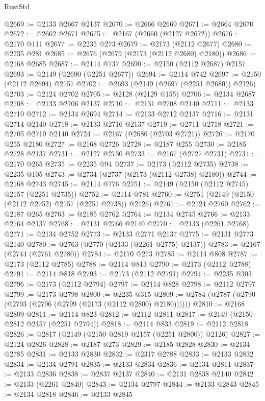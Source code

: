 \begin{lexlean}{RustStd}
\begin{coremodule}
@2669 := @2133 @2667 @2137
@2670 := @2666 @2669
@2671 := @2664 @2670
@2672 := @2662 @2671
@2675 := @2167 (@2660 (@2127 @2672))
@2676 := @2170 @111
@2677 := @2235 @273
@2679 := @2173 (@2112 @2677)
@2680 := @2235 @281
@2685 := @2676 (@2679 (@2173 (@2112 @2680) @2180))
@2686 := @2168 @2685
@2687 := @2114 @737
@2690 := @2150 (@2112 @2687) @2157
@2693 := @2149 (@2690 (@2251 @2677))
@2694 := @2114 @742
@2697 := @2150 (@2112 @2694) @2157
@2702 := @2693 (@2149 (@2697 (@2251 @2680)) @2126)
@2703 := @2124 @2702
@2705 := @2128 (@2129 @155)
@2706 := @2134 @2687
@2708 := @2133 @2706 @2137
@2710 := @2131 @2708 @2140
@2711 := @2133 @2710
@2712 := @2134 @2694
@2714 := @2133 @2712 @2137
@2716 := @2131 @2714 @2140
@2718 := @2133 @2716 @2137
@2719 := @2711 @2718
@2721 := @2705 @2719 @2140
@2724 := @2167 (@2686 (@2703 @2721))
@2726 := @2170 @255 @2180
@2727 := @2168 @2726
@2728 := @2187 @255
@2730 := @2185 @2728 @2137
@2731 := @2127 @2730
@2733 := @2167 (@2727 @2731)
@2734 := @2170 @265
@2735 := @2235 @94
@2737 := @2173 (@2112 @2735)
@2738 := @2235 @105
@2743 := @2734 (@2737 (@2173 (@2112 @2738) @2180))
@2744 := @2168 @2743
@2745 := @2114 @776
@2751 := @2149 (@2150 (@2112 @2745) @2157 (@2251 @2735))
@2752 := @2114 @781
@2760 := @2751 (@2149 (@2150 (@2112 @2752) @2157 (@2251 @2738)) @2126)
@2761 := @2124 @2760
@2762 := @2187 @265
@2763 := @2185 @2762
@2764 := @2134 @2745
@2766 := @2133 @2764 @2137
@2768 := @2131 @2766 @2140
@2770 := @2133 (@2261 @2768)
@2771 := @2134 @2752
@2773 := @2133 @2771 @2137
@2775 := @2131 @2773 @2140
@2780 := @2763 (@2770 (@2133 (@2261 @2775) @2137))
@2783 := @2167 (@2744 (@2761 @2780))
@2784 := @2170 @273
@2785 := @2114 @808
@2787 := @2173 (@2112 @2785)
@2788 := @2114 @813
@2790 := @2173 (@2112 @2788)
@2791 := @2114 @818
@2793 := @2173 (@2112 @2791)
@2794 := @2235 @303
@2796 := @2173 (@2112 @2794)
@2797 := @2114 @828
@2798 := @2112 @2797
@2799 := @2173 @2798
@2800 := @2235 @315
@2809 := @2784 (@2787 (@2790 (@2793 (@2796 (@2799 (@2173 (@2112 @2800) @2180))))))
@2810 := @2168 @2809
@2811 := @2114 @823
@2812 := @2112 @2811
@2817 := @2149 (@2150 @2812 @2157 (@2251 @2794))
@2818 := @2114 @833
@2819 := @2112 @2818
@2826 := @2817 (@2149 (@2150 @2819 @2157 (@2251 @2800)) @2126)
@2827 := @2124 @2826
@2828 := @2187 @273
@2829 := @2185 @2828
@2830 := @2134 @2785
@2831 := @2133 @2830
@2832 := @2317 @2788
@2833 := @2133 @2832
@2834 := @2134 @2791
@2835 := @2133 @2834
@2836 := @2134 @2811
@2837 := @2133 @2836
@2838 := @2837 @2137
@2840 := @2131 @2838 @2140
@2842 := @2133 (@2261 @2840)
@2843 := @2134 @2797
@2844 := @2133 @2843
@2845 := @2134 @2818
@2846 := @2133 @2845

\end{coremodule}
\end{lexlean}
